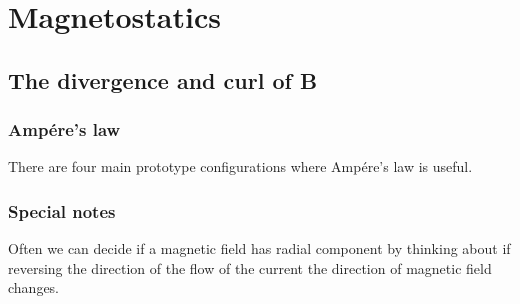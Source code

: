 \documentclass{report}
\begin{document}
\chapter{Magnetostatics}
\section{The divergence and curl of B}

\subsection{Amp\'ere's law}
There are four main prototype configurations where Amp\'ere's law is useful. 

\subsection{Special notes}
Often we can decide if a magnetic field has radial component by thinking about if reversing the direction of the flow of the current the direction of magnetic field changes. 
\end{document}
